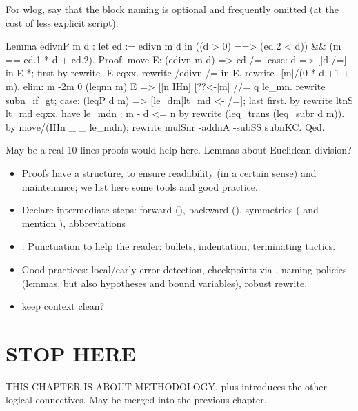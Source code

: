 For wlog, say that the block naming  is optional and frequently
omitted (at the cost of less explicit script).

\begin{coq}{}{}
Lemma edivnP m d :
 let ed := edivn m d in
   ((d > 0) ==> (ed.2 < d)) && (m == ed.1 * d + ed.2).
Proof.
move E: (edivn m d) => ed /=.
case: d => [|d /=] in E *; first by rewrite -E eqxx.
rewrite /edivn /= in E.
rewrite -[m]/(0 * d.+1 + m).
elim: m {-2}m 0 (leqnn m) E => [|n IHn] [??<-|m] //= q le_mn.
rewrite subn_if_gt; case: (leqP d m) => [le_dm|lt_md <- /=]; last first.
  by rewrite ltnS lt_md eqxx.
have le_mdn : m - d <= n by rewrite (leq_trans (leq_subr d m)).
by move/(IHn _ _ le_mdn); rewrite mulSnr -addnA -subSS subnKC.
Qed.
\end{coq}

May be a real 10 lines proofs would help here. Lemmas about Euclidean
division?
 \begin{itemize}
\item Proofs have a structure, to ensure readability (in a certain
  sense) and maintenance; we list here some tools and good practice.
\item Declare intermediate steps: forward (), backward
  (), symmetries ( and mention ),
abbreviations 
\item: Punctuation to help the reader: bullets, indentation,
  terminating tactics.
\item Good practices: local/early error detection, checkpoints via
  , naming policies (lemmas, but also hypotheses and bound
  variables), robust rewrite.
\item keep context clean?
\end{itemize}

\section{STOP HERE}

THIS CHAPTER IS ABOUT METHODOLOGY, plus introduces the other logical
connectives. May be merged into the previous chapter.


%

